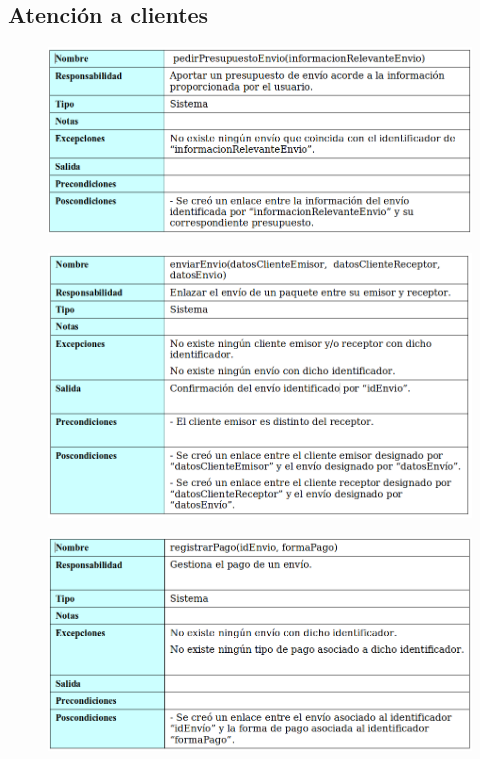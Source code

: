 \subsection{Atención a clientes}
\begin{figure}[H]
	\centering
	\includegraphics[width=16cm]{31}
\end{figure}
\begin{figure}[H]
	\centering
	\includegraphics[width=16cm]{32}
\end{figure}
\begin{figure}[H]
	\centering
	\includegraphics[width=16cm]{34}
\end{figure}
